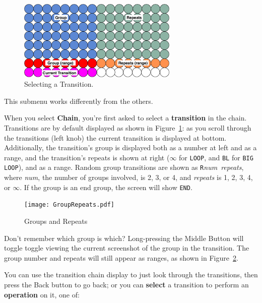 \documentclass{article}
\newcommand\bump{\vspace{11in}}
\begin{document}
\begin{figure}
\vspace{-1em}
\hspace{-2.5em}\includegraphics[width=3in]{SelectTransition}
\hspace{-2.5em}\caption{\small Selecting a Transition.~~~~~~~~~~~~~~~~~~~~}
\label{selecttransition}
\end{figure}

\noindent This submenu works differently from the others.  

When you select {\bf Chain}, you're first asked to select a {\bf transition} in the chain.  
Transitions are by default displayed as shown in Figure~\ref{selecttransition}: as you scroll through the transitions (left knob) the current transition is displayed at bottom.  Additionally, the transition's group is displayed both as a number at left and as a range, and the transition's repeats is shown at right (\(\infty\) for \texttt{LOOP}, and {\tt BL} for \texttt{BIG LOOP}), and as a range.  Random group transitions are shown as {\tt R}{\it num}~{\it repeats}, where {\it num}, the number of groups involved, is 2, 3, or 4, and {\it repeats} is 1, 2, 3, 4, or \(\infty\). If the group is an end group, the screen will show {\tt END}.   

\bump

\begin{figure}
\hspace{-2.5em}\texttt{[image: GroupRepeats.pdf]}
\hspace{-2.5em}\caption{\small Groups and Repeats~~~~~~~~~~~~~~~~~~~~}
\label{grouprepeats}
\end{figure}

Don't remember which group is which?  Long-pressing the Middle Button will toggle toggle viewing the current screenshot of the group in the transition.    The group number and repeats will still appear as ranges, as shown in Figure~\ref{grouprepeats}.

You can use the transition chain display to just look through the transitions, then press the Back button to go back; or you can {\bf select} a transition to perform an {\bf operation} on it, one of:
\end{document}
